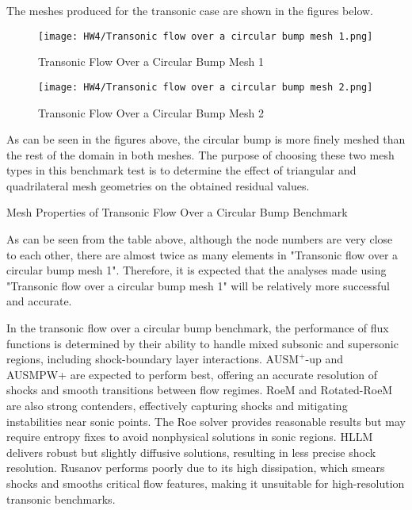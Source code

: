 \documentclass[a4paper, 12pt]{article}
\begin{document}
The meshes produced for the transonic case are shown in the figures below.

\begin{figure}[H]
    \centering
    \texttt{[image: HW4/Transonic flow over a circular bump mesh 1.png]}
    \caption{Transonic Flow Over a Circular Bump Mesh 1}
\end{figure}
\begin{figure}[H]
    \centering
    \texttt{[image: HW4/Transonic flow over a circular bump mesh 2.png]}
    \caption{Transonic Flow Over a Circular Bump Mesh 2}
\end{figure}

As can be seen in the figures above, the circular bump is more finely meshed than the rest of the domain in both meshes. The purpose of choosing these two mesh types in this benchmark test is to determine the effect of triangular and quadrilateral mesh geometries on the obtained residual values.

\begin{table}[H]
    \renewcommand\baselinestretch{1.1}\selectfont
    \centering
    \mbox{}
    \caption{Mesh Properties of Transonic Flow Over a Circular Bump Benchmark}
\end{table}

As can be seen from the table above, although the node numbers are very close to each other, there are almost twice as many elements in "Transonic flow over a circular bump mesh 1". Therefore, it is expected that the analyses made using "Transonic flow over a circular bump mesh 1" will be relatively more successful and accurate.\\\par
In the transonic flow over a circular bump benchmark, the performance of flux functions is determined by their ability to handle mixed subsonic and supersonic regions, including shock-boundary layer interactions. $\text{AUSM}^+\text{-up}$ and AUSMPW+ are expected to perform best, offering an accurate resolution of shocks and smooth transitions between flow regimes. RoeM and Rotated-RoeM are also strong contenders, effectively capturing shocks and mitigating instabilities near sonic points. The Roe solver provides reasonable results but may require entropy fixes to avoid nonphysical solutions in sonic regions. HLLM delivers robust but slightly diffusive solutions, resulting in less precise shock resolution. Rusanov performs poorly due to its high dissipation, which smears shocks and smooths critical flow features, making it unsuitable for high-resolution transonic benchmarks.
\end{document}
